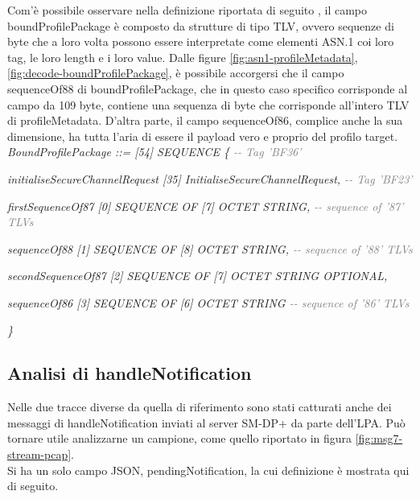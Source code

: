 \documentclass[10pt, oneside]{book}
\begin{document}
Com'è possibile osservare nella definizione riportata di seguito \cite{RSP-definitions}, il campo boundProfilePackage è composto da strutture di tipo TLV, ovvero sequenze di byte che a loro volta possono essere interpretate come elementi ASN.1 coi loro tag, le loro length e i loro value. Dalle figure \ref{fig:asn1-profileMetadata}, \ref{fig:decode-boundProfilePackage}, è possibile accorgersi che il campo sequenceOf88 di boundProfilePackage, che in questo caso specifico corrisponde al campo da 109 byte, contiene una sequenza di byte che corrisponde all'intero TLV di profileMetadata. D'altra parte, il campo sequenceOf86, complice anche la sua dimensione, ha tutta l'aria di essere il payload vero e proprio del profilo target.\\

\textit{BoundProfilePackage ::= [54] SEQUENCE \{ \textcolor{gray}{{-}{-} Tag 'BF36'}}

\hspace{0.75cm} \textit{initialiseSecureChannelRequest [35] InitialiseSecureChannelRequest, \textcolor{gray}{{-}{-} Tag 'BF23'}}

\hspace{0.75cm} \textit{firstSequenceOf87 [0] SEQUENCE OF [7] OCTET STRING, \textcolor{gray}{{-}{-} sequence of '87' TLVs}}

\hspace{0.75cm} \textit{sequenceOf88 [1] SEQUENCE OF [8] OCTET STRING, \textcolor{gray}{{-}{-} sequence of '88' TLVs}}

\hspace{0.75cm} \textit{secondSequenceOf87 [2] SEQUENCE OF [7] OCTET STRING OPTIONAL,}

\hspace{0.75cm} \textit{sequenceOf86 [3] SEQUENCE OF [6] OCTET STRING \textcolor{gray}{{-}{-} sequence of '86' TLVs}}

\textit{\}\\}

\subsection{Analisi di handleNotification}
Nelle due tracce diverse da quella di riferimento sono stati catturati anche dei messaggi di handleNotification inviati al server SM-DP+ da parte dell'LPA. Può tornare utile analizzarne un campione, come quello riportato in figura \ref{fig:msg7-stream-pcap}.\\
Si ha un solo campo JSON, pendingNotification, la cui definizione è mostrata qui di seguito.\\
\end{document}
